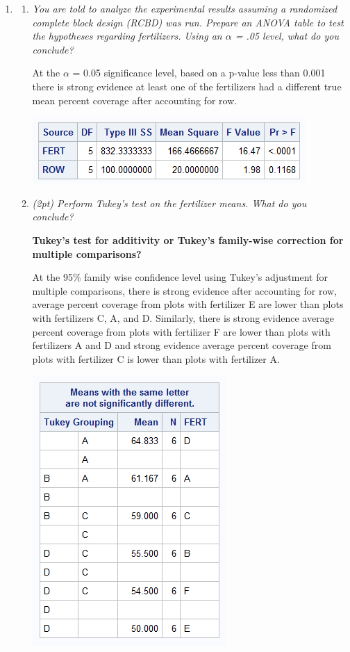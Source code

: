 \documentclass{article}\usepackage[]{graphicx}\usepackage[]{color}
\begin{document}
\begin{enumerate}

\item
\begin{enumerate}
\item %

{\it You are told to analyze the experimental results assuming a randomized complete block design (RCBD) was run. Prepare an ANOVA table to test the hypotheses regarding fertilizers. Using an $\alpha$ = .05 level, what do you conclude?}

At the $\alpha$ = 0.05 significance level, based on a p-value less than 0.001 there is strong evidence at least one of the fertilizers had a different true mean percent coverage after accounting for row.

\begin{center}
\includegraphics{prob1a}
\end{center}

\item 
{\it (2pt) Perform Tukey's test on the fertilizer means. What do you conclude?}

{\bf Tukey's test for additivity or Tukey's family-wise correction for multiple comparisons?}

At the 95\% family wise confidence level using Tukey's adjustment for multiple comparisons, there is strong evidence after accounting for row, average percent coverage from plots with fertilizer E are lower than plots with fertilizers C, A, and D. Similarly, there is strong evidence average percent coverage from plots with fertilizer F are lower than plots with fertilizers A and D and strong evidence average percent coverage from plots with fertilizer C is lower than plots with fertilizer A.

\begin{center}
\includegraphics{prob1b}
\end{center}


\end{enumerate}
\end{enumerate}
\end{document}
